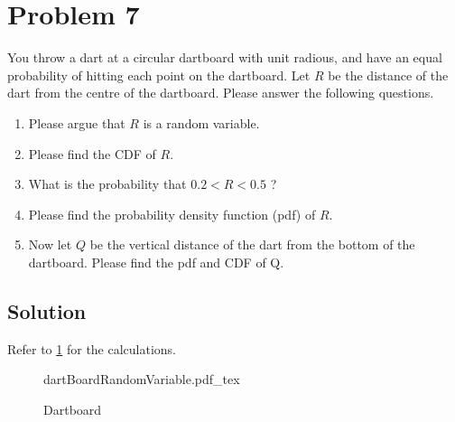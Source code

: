 \section{Problem 7}
You throw a dart at a circular dartboard with unit radious, and have an equal probability of hitting each point on the dartboard. Let $R$ be the distance of the dart from the centre of the dartboard. Please answer the following questions.

\begin{enumerate}[7a.]
	\item Please argue that $R$ is a random variable.
	\item Please find the CDF of $R$.
	\item What is the probability that $0.2<R<0.5$ ?
	\item Please find the probability density function (pdf) of $R$.
	\item Now let $Q$ be the vertical distance of the dart from the bottom of the dartboard. Please find the pdf and CDF of Q.
\end{enumerate}
\subsection{Solution}

Refer to \cref{fig:dartBoardRandomVariable} for the calculations.

\begin{figure}[H]
	\centering
	\begin{adjustbox}{max width=0.9\textwidth}
		{dartBoardRandomVariable.pdf_tex}
	\end{adjustbox}
	\caption{Dartboard}
	\label{fig:dartBoardRandomVariable}
\end{figure}

